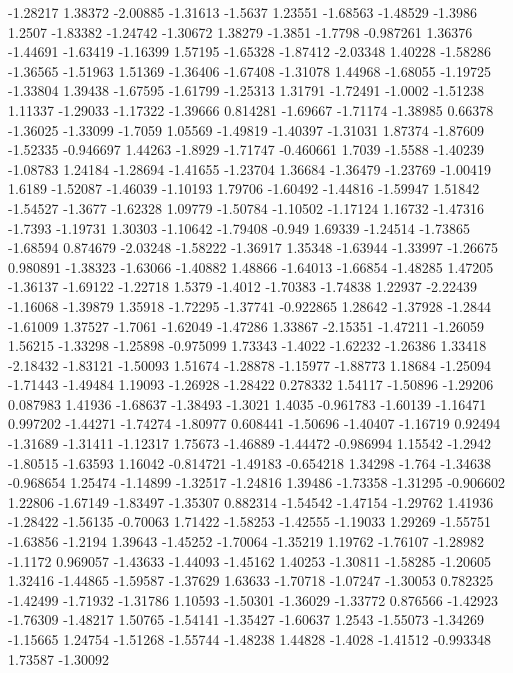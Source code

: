 \documentclass[9pt]{article}
\theoremstyle{plain}
\theoremstyle{definition}
\theoremstyle{remark}
\numberwithin{equation}{section}
\begin{document}
-1.28217
1.38372
-2.00885
-1.31613
-1.5637
1.23551
-1.68563
-1.48529
-1.3986
1.2507
-1.83382
-1.24742
-1.30672
1.38279
-1.3851
-1.7798
-0.987261
1.36376
-1.44691
-1.63419
-1.16399
1.57195
-1.65328
-1.87412
-2.03348
1.40228
-1.58286
-1.36565
-1.51963
1.51369
-1.36406
-1.67408
-1.31078
1.44968
-1.68055
-1.19725
-1.33804
1.39438
-1.67595
-1.61799
-1.25313
1.31791
-1.72491
-1.0002
-1.51238
1.11337
-1.29033
-1.17322
-1.39666
0.814281
-1.69667
-1.71174
-1.38985
0.66378
-1.36025
-1.33099
-1.7059
1.05569
-1.49819
-1.40397
-1.31031
1.87374
-1.87609
-1.52335
-0.946697
1.44263
-1.8929
-1.71747
-0.460661
1.7039
-1.5588
-1.40239
-1.08783
1.24184
-1.28694
-1.41655
-1.23704
1.36684
-1.36479
-1.23769
-1.00419
1.6189
-1.52087
-1.46039
-1.10193
1.79706
-1.60492
-1.44816
-1.59947
1.51842
-1.54527
-1.3677
-1.62328
1.09779
-1.50784
-1.10502
-1.17124
1.16732
-1.47316
-1.7393
-1.19731
1.30303
-1.10642
-1.79408
-0.949
1.69339
-1.24514
-1.73865
-1.68594
0.874679
-2.03248
-1.58222
-1.36917
1.35348
-1.63944
-1.33997
-1.26675
0.980891
-1.38323
-1.63066
-1.40882
1.48866
-1.64013
-1.66854
-1.48285
1.47205
-1.36137
-1.69122
-1.22718
1.5379
-1.4012
-1.70383
-1.74838
1.22937
-2.22439
-1.16068
-1.39879
1.35918
-1.72295
-1.37741
-0.922865
1.28642
-1.37928
-1.2844
-1.61009
1.37527
-1.7061
-1.62049
-1.47286
1.33867
-2.15351
-1.47211
-1.26059
1.56215
-1.33298
-1.25898
-0.975099
1.73343
-1.4022
-1.62232
-1.26386
1.33418
-2.18432
-1.83121
-1.50093
1.51674
-1.28878
-1.15977
-1.88773
1.18684
-1.25094
-1.71443
-1.49484
1.19093
-1.26928
-1.28422
0.278332
1.54117
-1.50896
-1.29206
0.087983
1.41936
-1.68637
-1.38493
-1.3021
1.4035
-0.961783
-1.60139
-1.16471
0.997202
-1.44271
-1.74274
-1.80977
0.608441
-1.50696
-1.40407
-1.16719
0.92494
-1.31689
-1.31411
-1.12317
1.75673
-1.46889
-1.44472
-0.986994
1.15542
-1.2942
-1.80515
-1.63593
1.16042
-0.814721
-1.49183
-0.654218
1.34298
-1.764
-1.34638
-0.968654
1.25474
-1.14899
-1.32517
-1.24816
1.39486
-1.73358
-1.31295
-0.906602
1.22806
-1.67149
-1.83497
-1.35307
0.882314
-1.54542
-1.47154
-1.29762
1.41936
-1.28422
-1.56135
-0.70063
1.71422
-1.58253
-1.42555
-1.19033
1.29269
-1.55751
-1.63856
-1.2194
1.39643
-1.45252
-1.70064
-1.35219
1.19762
-1.76107
-1.28982
-1.1172
0.969057
-1.43633
-1.44093
-1.45162
1.40253
-1.30811
-1.58285
-1.20605
1.32416
-1.44865
-1.59587
-1.37629
1.63633
-1.70718
-1.07247
-1.30053
0.782325
-1.42499
-1.71932
-1.31786
1.10593
-1.50301
-1.36029
-1.33772
0.876566
-1.42923
-1.76309
-1.48217
1.50765
-1.54141
-1.35427
-1.60637
1.2543
-1.55073
-1.34269
-1.15665
1.24754
-1.51268
-1.55744
-1.48238
1.44828
-1.4028
-1.41512
-0.993348
1.73587
-1.30092
\end{document}

